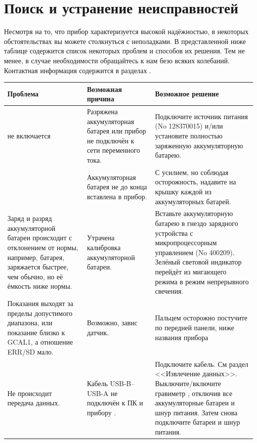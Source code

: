 
\section{Поиск и устранение неисправностей}


Несмотря на то, что прибор \cg{} характеризуется высокой надёжностью, в некоторых
обстоятельствах вы можете столкнуться с неполадками. В представленной ниже
таблице содержится список некоторых проблем и способов их решения. Тем не менее,
в случае необходимости обращайтесь к нам безо всяких колебаний. Контактная
информация содержится в разделах .

\begin{longtable}{|p{}|p{}|p{}|}
  \hline
  Проблема & Возможная причина & Возможное решение \\
  \hline
  \cg{} не включается &
  Разряжена аккумуляторная батарея или прибор не подключён к сети переменного
  тока. & 
  Подключите источник питания (No 128370015) и/или установите полностью
  заряженную аккумуляторную батарею. \\
  \cline{2-3}
  & Аккумуляторная батарея не до конца вставлена в прибор. &
  С усилием, но соблюдая осторожность, надавите на крышку каждой из
  аккумуляторных батарей. \\
  \hline
  Заряд и разряд аккумуляторной батареи происходит с отклонением от нормы,
  например, батарея, заряжается быстрее, чем обычно, но её ёмкость ниже нормы. &
  Утрачена калибровка аккумуляторной батареи. &
  Вставьте аккумуляторную батарею в гнездо зарядного устройства с
  микропроцессорным управлением (No 400209).  Зелёный световой индикатор перейдёт
  из мигающего режима в режим непрерывного свечения. \\
  \hline
  Показания выходят за пределы допустимого диапазона, или показание близко к
  GCAL1, а отношение ERR/SD мало. &
  Возможно, завис датчик. &
  Пальцем осторожно постучите по передней панели, ниже названия прибора \cg{} \\
  \hline
  Не происходит передача данных. & Кабель USB-B--USB-A не подключён к ПК и
  прибору \cg{}. &
  Подключите кабель. См раздел <<Извлечение данных>>. Выключите/включите
  гравиметр \cg{}, отключив все аккумуляторные батареи и шнур питания. Затем
  снова подключите батареи и шнур питания. \\
  \hline
\end{longtable}
